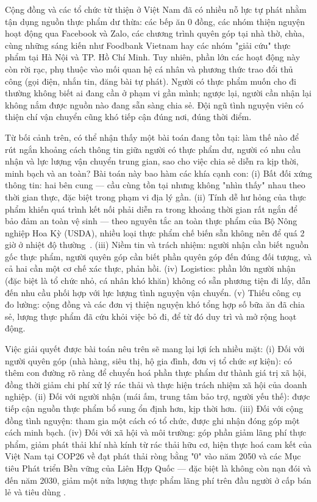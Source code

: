 \documentclass[../main.tex]{subfiles}%
\begin{document}
Cộng đồng và các tổ chức từ thiện ở Việt Nam đã có nhiều nỗ lực tự phát nhằm tận dụng nguồn thực phẩm dư thừa: các bếp ăn 0 đồng, các nhóm thiện nguyện hoạt động qua Facebook và Zalo, các chương trình quyên góp tại nhà thờ, chùa, cùng những sáng kiến như Foodbank Vietnam \cite{FoodBankVietnam_Home} hay các nhóm "giải cứu" thực phẩm tại Hà Nội và TP. Hồ Chí Minh. Tuy nhiên, phần lớn các hoạt động này còn rời rạc, phụ thuộc vào mối quan hệ cá nhân và phương thức trao đổi thủ công (gọi điện, nhắn tin, đăng bài tự phát). Người có thực phẩm muốn cho đi thường không biết ai đang cần ở phạm vi gần mình; ngược lại, người cần nhận lại không nắm được nguồn nào đang sẵn sàng chia sẻ. Đội ngũ tình nguyện viên có thiện chí vận chuyển cũng khó tiếp cận đúng nơi, đúng thời điểm.

Từ bối cảnh trên, có thể nhận thấy một bài toán đang tồn tại: làm thế nào để rút ngắn khoảng cách thông tin giữa người có thực phẩm dư, người có nhu cầu nhận và lực lượng vận chuyển trung gian, sao cho việc chia sẻ diễn ra kịp thời, minh bạch và an toàn? Bài toán này bao hàm các khía cạnh con: (i) Bất đối xứng thông tin: hai bên cung — cầu cùng tồn tại nhưng không "nhìn thấy" nhau theo thời gian thực, đặc biệt trong phạm vi địa lý gần. (ii) Tính dễ hư hỏng của thực phẩm khiến quá trình kết nối phải diễn ra trong khoảng thời gian rất ngắn để bảo đảm an toàn vệ sinh — theo nguyên tắc an toàn thực phẩm của Bộ Nông nghiệp Hoa Kỳ (USDA), nhiều loại thực phẩm chế biến sẵn không nên để quá 2 giờ ở nhiệt độ thường~\cite{USDA_DangerZone}. (iii) Niềm tin và trách nhiệm: người nhận cần biết nguồn gốc thực phẩm, người quyên góp cần biết phần quyên góp đến đúng đối tượng, và cả hai cần một cơ chế xác thực, phản hồi. (iv) Logistics: phần lớn người nhận (đặc biệt là tổ chức nhỏ, cá nhân khó khăn) không có sẵn phương tiện đi lấy, dẫn đến nhu cầu phối hợp với lực lượng tình nguyện vận chuyển. (v) Thiếu công cụ đo lường: cộng đồng và các đơn vị thiện nguyện khó tổng hợp số bữa ăn đã chia sẻ, lượng thực phẩm đã cứu khỏi việc bỏ đi, để từ đó duy trì và mở rộng hoạt động.

Việc giải quyết được bài toán nêu trên sẽ mang lại lợi ích nhiều mặt: (i) Đối với người quyên góp (nhà hàng, siêu thị, hộ gia đình, đơn vị tổ chức sự kiện): có thêm con đường rõ ràng để chuyển hoá phần thực phẩm dư thành giá trị xã hội, đồng thời giảm chi phí xử lý rác thải và thực hiện trách nhiệm xã hội của doanh nghiệp. (ii) Đối với người nhận (mái ấm, trung tâm bảo trợ, người yếu thế): được tiếp cận nguồn thực phẩm bổ sung ổn định hơn, kịp thời hơn. (iii) Đối với cộng đồng tình nguyện: tham gia một cách có tổ chức, được ghi nhận đóng góp một cách minh bạch. (iv) Đối với xã hội và môi trường: góp phần giảm lãng phí thực phẩm, giảm phát thải khí nhà kính từ rác thải hữu cơ, hiện thực hoá cam kết của Việt Nam tại COP26 về đạt phát thải ròng bằng "0" vào năm 2050 \cite{BoCongThuong_COP26} và các Mục tiêu Phát triển Bền vững của Liên Hợp Quốc — đặc biệt là không còn nạn đói và đến năm 2030, giảm một nửa lượng thực phẩm lãng phí trên đầu người ở cấp bán lẻ và tiêu dùng \cite{UN_Agenda2030}.
\end{document}
